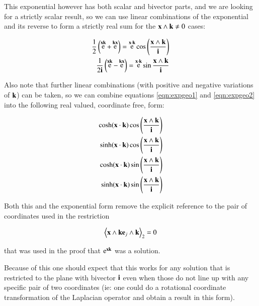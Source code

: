 \documentclass{article}      %
\DeclareMathOperator{\Exp}{e}
\newcommand{\gpgrade}[2] {{\left\langle{{#1}}\right\rangle}_{#2}}
\newcommand{\gpgradetwo}[1] {\gpgrade{#1}{2}}
\begin{document}
This exponential however has both scalar and bivector parts, and we are looking for a strictly scalar result, so we can use linear combinations of the
exponential and its reverse to form a strictly real sum for the $\mathbf{x} \wedge \mathbf{k} \ne 0$ cases:

\begin{align*}
\inv{2}\left(\Exp^{\Bx\Bk} + \Exp^{\Bk\Bx}\right) = \Exp^{\Bx\cdot\Bk}\cos\left(\frac{\Bx \wedge \Bk}{\Bi}\right) \\
\inv{2\Bi}\left(\Exp^{\Bx\Bk} - \Exp^{\Bk\Bx}\right) = \Exp^{\Bx\cdot\Bk}\sin{\frac{\Bx \wedge \Bk}{\Bi}} \\
\end{align*}

Also note that further linear combinations (with positive and negative variations of $\mathbf{k}$) can be taken, so we can
combine equations \ref{eqn:expgeo1} and \ref{eqn:expgeo2} into the following real valued, coordinate free, form:

\begin{align*}
\cosh(\mathbf{x}\cdot\mathbf{k})\cos\left({\frac{\mathbf{x} \wedge \mathbf{k}}{\mathbf{i}}}\right) \\
\sinh(\mathbf{x}\cdot\mathbf{k})\cos\left({\frac{\mathbf{x} \wedge \mathbf{k}}{\mathbf{i}}}\right) \\
\cosh(\mathbf{x}\cdot\mathbf{k})\sin\left({\frac{\mathbf{x} \wedge \mathbf{k}}{\mathbf{i}}}\right) \\
\sinh(\mathbf{x}\cdot\mathbf{k})\sin\left({\frac{\mathbf{x} \wedge \mathbf{k}}{\mathbf{i}}}\right) \\
\end{align*}

Both this and the exponential form remove the explicit reference to the pair of coordinates 
used in the restriction 

\[
\gpgradetwo{ \Bx \wedge \Bk \Be_j \wedge \Bk } = 0
\]

that was used in the proof that $\Exp^{\Bx\Bk}$ was a solution.

Because of this one should expect that this
works for any solution that is restricted to the plane with bivector $\mathbf{i}$ even when those do not line up
with any specific pair of two coordinates (ie: one could do a rotational coordinate transformation of the 
Laplacian operator and obtain a result in this form).
\end{document}

